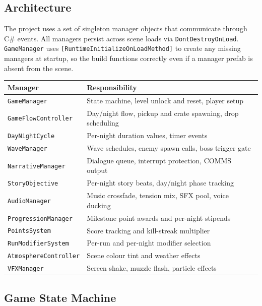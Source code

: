 \documentclass[11pt,a4paper]{article}
\begin{document}
\subsection{Architecture}

The project uses a set of singleton manager objects that communicate through C\# events. All managers persist across scene loads via \texttt{DontDestroyOnLoad}. \texttt{GameManager} uses \texttt{[RuntimeInitializeOnLoadMethod]} to create any missing managers at startup, so the build functions correctly even if a manager prefab is absent from the scene.

\begin{center}
\small
\begin{tabular}{@{} l l @{}}
\toprule
\textbf{Manager} & \textbf{Responsibility} \\
\midrule
\texttt{GameManager} & State machine, level unlock and reset, player setup \\
\texttt{GameFlowController} & Day/night flow, pickup and crate spawning, drop scheduling \\
\texttt{DayNightCycle} & Per-night duration values, timer events \\
\texttt{WaveManager} & Wave schedules, enemy spawn calls, boss trigger gate \\
\texttt{NarrativeManager} & Dialogue queue, interrupt protection, COMMS output \\
\texttt{StoryObjective} & Per-night story beats, day/night phase tracking \\
\texttt{AudioManager} & Music crossfade, tension mix, SFX pool, voice ducking \\
\texttt{ProgressionManager} & Milestone point awards and per-night stipends \\
\texttt{PointsSystem} & Score tracking and kill-streak multiplier \\
\texttt{RunModifierSystem} & Per-run and per-night modifier selection \\
\texttt{AtmosphereController} & Scene colour tint and weather effects \\
\texttt{VFXManager} & Screen shake, muzzle flash, particle effects \\
\bottomrule
\end{tabular}
\end{center}

\subsection{Game State Machine}
\end{document}
